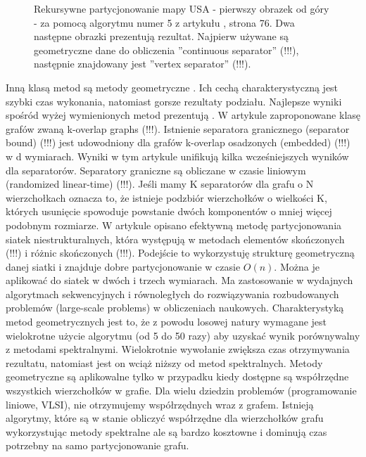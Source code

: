 \begin{figure}
    \caption{Rekursywne partycjonowanie mapy USA - pierwszy obrazek od góry - za pomocą algorytmu numer 5 z artykułu \cite{MiTeThVa93},
        strona 76. Dwa następne obrazki prezentują rezultat. Najpierw używane są geometryczne dane do obliczenia
        ''continuous separator'' (!!!), następnie znajdowany jest ''vertex separator'' (!!!).}
\end{figure}


Inną klasą metod są metody geometryczne
\cite{Miller1994ACP, Raghavan93lineand, 185417, MiTeThVa93, NourOmid1987SolvingFE}.
Ich cechą charakterystyczną jest szybki czas wykonania, natomiast gorsze rezultaty podziału.
Najlepsze wyniki spośród wyżej wymienionych metod prezentują \cite{185417, MiTeThVa93}.
W artykule \cite{185417} zaproponowane klasę grafów zwaną k-overlap graphs (!!!). Istnienie
separatora granicznego (separator bound) (!!!) jest udowodniony dla grafów k-overlap osadzonych (embedded) (!!!) w d wymiarach. Wyniki w tym
artykule unifikują kilka wcześniejszych wyników dla separatorów.
Separatory graniczne są obliczane w czasie liniowym (randomized linear-time) (!!!).
Jeśli mamy K separatorów dla grafu o N wierzchołkach oznacza to, że istnieje podzbiór wierzchołków o wielkości K,
których usunięcie spowoduje powstanie dwóch komponentów o mniej więcej podobnym rozmiarze.
W artykule \cite{MiTeThVa93} opisano efektywną metodę partycjonowania siatek niestrukturalnych, która występują w metodach
elementów skończonych (!!!) i różnic skończonych (!!!). Podejście to wykorzystuję strukturę geometryczną danej siatki i znajduje
dobre partycjonowanie w czasie \(O(n)\). Można je aplikować do siatek w dwóch i trzech wymiarach. Ma zastosowanie
w wydajnych algorytmach sekwencyjnych i równoległych do rozwiązywania rozbudowanych problemów (large-scale problems)
w obliczeniach naukowych.
Charakterystyką metod geometrycznych jest to, że z powodu losowej natury wymagane jest wielokrotne użycie algorytmu
(od 5 do 50 razy) aby uzyskać wynik porównywalny z metodami spektralnymi.
Wielokrotnie wywołanie zwiększa czas otrzymywania rezultatu, natomiast jest
on wciąż niższy od metod spektralnych. Metody geometryczne są aplikowalne tylko w przypadku kiedy dostępne
są współrzędne wszystkich wierzchołków w grafie. Dla wielu dziedzin problemów (programowanie liniowe, VLSI),
nie otrzymujemy współrzędnych wraz z grafem. Istnieją algorytmy, które są w stanie obliczyć współrzędne dla
wierzchołków grafu \cite{Chan95geometricspectral} wykorzystując metody spektralne ale są bardzo kosztowne i dominują czas potrzebny
na samo partycjonowanie grafu.

